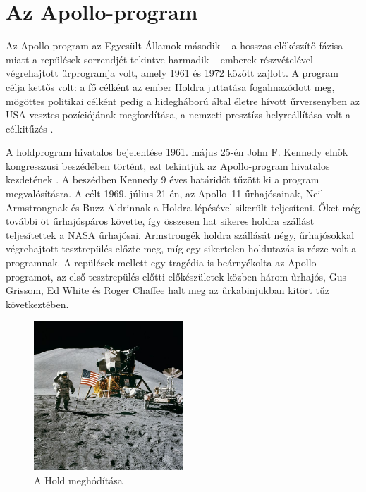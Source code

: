 \documentclass[12pt]{article}
\begin{document}



\tableofcontents\vfill


\section{Az Apollo-program}

Az Apollo-program az Egyesült Államok második – a hosszas előkészítő fázisa miatt a repülések sorrendjét tekintve harmadik – emberek részvételével végrehajtott űrprogramja volt, amely 1961 és 1972 között zajlott. A program célja kettős volt: a fő célként az ember Holdra juttatása fogalmazódott meg, mögöttes politikai célként pedig a hidegháború által életre hívott űrversenyben az USA vesztes pozíciójának megfordítása, a nemzeti presztízs helyreállítása volt a célkitűzés \cite{Wettl2004}.

A holdprogram hivatalos bejelentése 1961. május 25-én John F. Kennedy elnök kongresszusi beszédében történt, ezt tekintjük az Apollo-program hivatalos kezdetének \cite{Cindy1986}. A beszédben Kennedy 9 éves határidőt tűzött ki a program megvalósításra. A célt 1969. július 21-én, az Apollo–11 űrhajósainak, Neil Armstrongnak és Buzz Aldrinnak a Holdra lépésével sikerült teljesíteni. Őket még további öt űrhajóspáros követte, így összesen hat sikeres holdra szállást teljesítettek a NASA űrhajósai. Armstrongék holdra szállását négy, űrhajósokkal végrehajtott tesztrepülés előzte meg, míg egy sikertelen holdutazás is része volt a programnak. A repülések mellett egy tragédia is beárnyékolta az Apollo-programot, az első tesztrepülés előtti előkészületek közben három űrhajós, Gus Grissom, Ed White és Roger Chaffee halt meg az űrkabinjukban kitört tűz következtében.

\begin{figure}[htb]
  \centering
  \includegraphics[width=0.5\textwidth]{images/foto}
  \caption{A Hold meghódítása}
  \label{fig:foto}
\end{figure}
\end{document}
